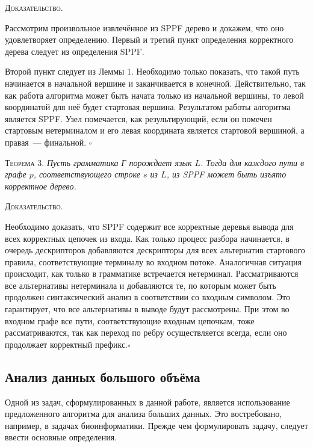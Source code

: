 \textsc{Доказательство.}

Рассмотрим произвольное извлечённое из SPPF дерево и докажем, что оно удовлетворяет определению. Первый и третий пункт определения корректного дерева следует из определения SPPF. 

Второй пункт следует из Леммы 1. Необходимо только показать, что такой путь начинается в начальной вершине и заканчивается в конечной. Действительно, так как работа алгоритма может быть начата только из начальной вершины, то левой координатой для неё будет стартовая вершина. Результатом работы алгоритма является SPPF. Узел помечается, как результирующий, если он помечен стартовым нетерминалом и его левая координата является стартовой вершиной, а правая~--- финальной. $\square$

\textsc{Теорема 3.} 
\textit{Пусть грамматика Г порождает язык $L$. Тогда для каждого пути в графе $p$, соответствующего строке $s$ из $L$, из SPPF может быть изъято корректное дерево.}

\textsc{Доказательство.}

Необходимо доказать, что SPPF содержит все корректные деревья вывода для всех корректных цепочек из входа. Как только процесс разбора начинается, в очередь дескрипторов добавляются дескрипторы для всех альтернатив стартового правила, соответствующие терминалу во входном потоке. Аналогичная ситуация происходит, как только в грамматике встречается нетерминал. Рассматриваются все альтернативы нетерминала и добавляются те, по которым может быть продолжен синтаксический анализ в соответствии со входным символом. Это гарантирует, что все альтернативы в выводе будут рассмотрены. При этом во входном графе все пути, соответствующие входным цепочкам, тоже рассматриваются, так как переход по ребру осуществляется всегда, если оно продолжает корректный префикс.$\square$

\subsection{Анализ данных большого объёма}
Одной из задач, сформулированных в данной работе, является использование предложенного алгоритма для анализа больших данных. Это востребовано, например, в задачах биоинформатики. Прежде чем формулировать задачу, следует ввести основные определения.

